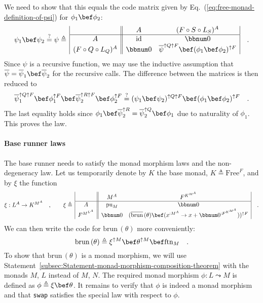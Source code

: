We need to show that this equals the code matrix given by Eq.~(\ref{eq:free-monad-definition-of-psi})
for $\phi_{1}\bef\phi_{2}$:
\[
\psi_{1}\bef\psi_{2}\overset{?}{=}\psi\triangleq\,\begin{array}{|c||cc|}
 & A & (F\circ S\circ L_{S})^{A}\\
\hline A & \text{id} & \bbnum 0\\
(F\circ Q\circ L_{Q})^{A} & \bbnum 0 & \overline{\psi}^{\uparrow Q\uparrow F}\bef(\phi_{1}\bef\phi_{2})^{\uparrow F}
\end{array}\quad.
\]
Since $\psi$ is a recursive function, we may use the inductive assumption
that $\overline{\psi}=\overline{\psi}_{1}\bef\overline{\psi}_{2}$
for the recursive calls. The difference between the matrices is then
reduced to
\[
\overline{\psi}_{1}^{\uparrow Q\uparrow F}\bef\phi_{1}^{\uparrow F}\bef\overline{\psi}_{2}^{\uparrow R\uparrow F}\bef\phi_{2}^{\uparrow F}\overset{?}{=}(\psi_{1}\bef\psi_{2})^{\uparrow Q\uparrow F}\bef(\phi_{1}\bef\phi_{2})^{\uparrow F}\quad.
\]
The last equality holds since $\phi_{1}\bef\overline{\psi}_{2}^{\uparrow R}=\overline{\psi}_{2}^{\uparrow Q}\bef\phi_{1}$
due to naturality of $\phi_{1}$. This proves the law.

\paragraph{Base runner laws}

The base runner needs to satisfy the monad morphism laws and the non-degeneracy
law. Let us temporarily denote by $K$ the base monad, $K\triangleq\text{Free}^{F}$,
and by $\xi$ the function
\[
\xi:L^{A}\rightarrow K^{M^{A}}\quad,\quad\quad\xi\triangleq\,\begin{array}{|c||cc|}
 & M^{A} & F^{K^{M^{A}}}\\
\hline A & \text{pu}_{M} & \bbnum 0\\
F^{M^{L^{A}}} & \bbnum 0 & (\overline{\text{brun}}\,(\theta)\bef(x^{:M^{A}}\rightarrow x+\bbnum 0^{:F^{K^{M^{A}}}}))^{\uparrow F}
\end{array}\quad.
\]
We can then write the code for $\text{brun}\,(\theta)$ more conveniently:
\[
\text{brun}\,(\theta)\triangleq\xi^{\uparrow M}\bef\theta^{\uparrow M}\bef\text{ftn}_{M}\quad.
\]
To show that $\text{brun}\,(\theta)$ is a monad morphism, we will
use Statement~\ref{subsec:Statement-monad-morphism-composition-theorem}
with the monads $M$, $L$ instead of $M$, $N$. The required monad
morphism $\phi:L\leadsto M$ is defined as $\phi\triangleq\xi\bef\theta$.
It remains to verify that $\phi$ is indeed a monad morphism and that
\lstinline!swap! satisfies the special law with respect to $\phi$.

